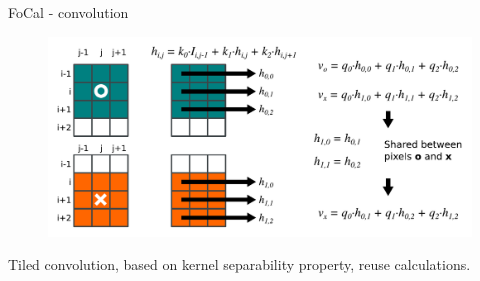 \documentclass[17pt,mathserif]{beamer}
\begin{document}
    \begin{frame}{FoCal - convolution}
      \vspace*{-5em}
      \centering
      \begin{figure}
        \includegraphics[width=\textwidth]{./tiled-conv}
      \end{figure}
      \vspace*{-1em}
        Tiled convolution, based on kernel separability property, reuse calculations.
      
    \end{frame}
%    
\end{document}

